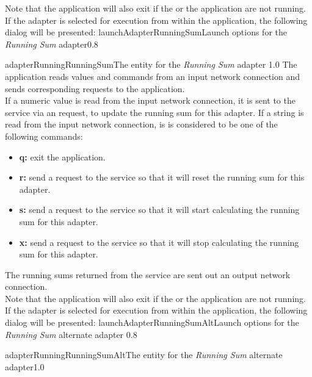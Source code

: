 Note that the application will also exit if the  or the
 application are not running.\\

\insertStandardAdapterCommands
\condPage{}
If the adapter is selected for execution from within the \emph{\MMMU} application, the
following dialog will be presented:
%
{launchAdapterRunningSum}{Launch options for the \emph{Running Sum} adapter}{0.8}

%
{adapterRunningRunningSum}{The \emph{\MMMU} entity for the \emph{Running Sum} adapter}%
{1.0}
\condPage
{}
The  application reads  values and
commands from an input \yarp{} network connection and sends corresponding requests to the
 application.\\

If a numeric value is read from the input \yarp{} network connection, it is sent to the
service via an  request, to update the running
sum for this adapter.
If a string is read from the input \yarp{} network connection, is is considered to be one
of the following commands:
\begin{itemize}
\item\textbf{q:} exit the application.
\item\exSp\textbf{r:} send a  request to the
service so that it will reset the running sum for this adapter.
\item\exSp\textbf{s:} send a  request to the
service so that it will start calculating the running sum for this adapter.
\item\exSp\textbf{x:} send a  request to the
service so that it will stop calculating the running sum for this adapter.
\end{itemize}
The running sums returned from the service are sent out an output \yarp{} network
connection.\\

Note that the application will also exit if the  or the
 application are not running.\\

\insertStandardAdapterCommands
\condPage{}
If the adapter is selected for execution from within the \emph{\MMMU} application, the
following dialog will be presented:
%
{launchAdapterRunningSumAlt}{Launch options for the \emph{Running Sum} alternate adapter}%
{0.8}

%
{adapterRunningRunningSumAlt}{The \emph{\MMMU} entity for the \emph{Running Sum} alternate
adapter}{1.0}
\secondaryEnd
\appendixEnd{}
